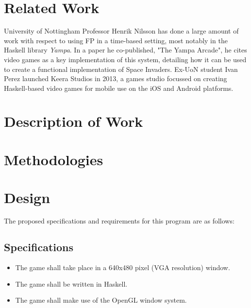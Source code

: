 \documentclass[12pt, a4paper]{report}
\begin{document}
\section{Related Work}
University of Nottingham Professor Henrik Nilsson has done a large amount of work with respect to using FP in a time-based setting, most notably in the Haskell library \textit{Yampa}.
In a paper he co-published, "The Yampa Arcade"\cite{yampaarcade}, he cites video games as a key implementation of this system, detailing how it can be used to create a functional implementation of Space Invaders.
Ex-UoN student Ivan Perez launched Keera Studios in 2013, a games studio focussed on creating Haskell-based video games for mobile use on the iOS and Android platforms.


\section{Description of Work}


\section{Methodologies}


\section{Design}
The proposed specifications and requirements for this program are as follows:

\subsection{Specifications}
\begin{itemize}
  \item The game shall take place in a 640x480 pixel (VGA resolution) window.
  \item The game shall be written in Haskell.
  \item The game shall make use of the OpenGL window system.
\end{itemize}
\end{document}

